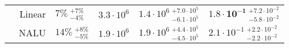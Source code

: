 \begin{table}[!h]
\begin{tabular}{crllll}
\nopagebreak
 & Linear & $7\% {~}^{+7\%}_{-4\%}$ & $3.3 \cdot 10^{6}$ & $1.4 \cdot 10^{6} {~}^{+7.0 \cdot 10^{5}}_{-6.1 \cdot 10^{5}}$ & $\mathbf{1.8 \cdot 10^{-1}} {~}^{+7.2 \cdot 10^{-2}}_{-5.8 \cdot 10^{-2}}$\\

\nopagebreak
\multirow{-3}{*}{\centering\arraybackslash $\bm{-}$} & NALU & $14\% {~}^{+8\%}_{-5\%}$ & $1.9 \cdot 10^{6}$ & $1.9 \cdot 10^{6} {~}^{+4.4 \cdot 10^{5}}_{-4.5 \cdot 10^{5}}$ & $2.1 \cdot 10^{-1} {~}^{+2.2 \cdot 10^{-2}}_{-2.2 \cdot 10^{-2}}$\\
\bottomrule
\end{tabular}
\end{table}
